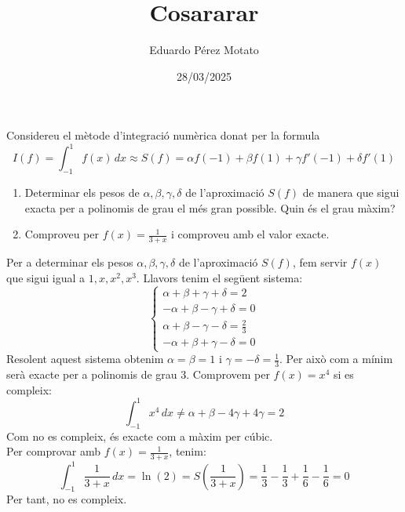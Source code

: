 \documentclass[a4paper, 12pt]{article}
\title{Cosararar}
\author{Eduardo Pérez Motato}
\date{28/03/2025}
\begin{document}
    \makeheader

    \begin{exercici}
    	Considereu el mètode d'integració numèrica donat per la formula
        \begin{displaymath}
        	I(f) = \int_{-1}^{1} f(x) \, dx \approx S(f) = \alpha f(-1) + \beta f(1) + \gamma f'(-1) + \delta f'(1)
        \end{displaymath}
        \begin{enumerate}
        	\item Determinar els pesos de $\alpha, \beta, \gamma, \delta$ de l'aproximació $S(f)$ de manera que sigui exacta per a polinomis de grau el més gran possible. Quin és el grau màxim?
         	\item Comproveu per $f(x) = \frac{1}{3+x}$ i comproveu amb el valor exacte.
        \end{enumerate}
    \end{exercici}
    \begin{solucio}
    	Per a determinar els pesos $\alpha, \beta, \gamma, \delta$ de l'aproximació $S(f)$, fem servir $f(x)$ que sigui igual a $1, x, x^2, x^3$.
     	Llavors tenim el següent sistema:
      	\begin{displaymath}
	      	\begin{cases}
	       	    \alpha + \beta + \gamma + \delta = 2 \\
				-\alpha + \beta - \gamma + \delta = 0 \\
				\alpha + \beta - \gamma - \delta = \frac{2}{3} \\
				-\alpha + \beta + \gamma - \delta = 0
	       	\end{cases}
	  	\end{displaymath}
        Resolent aquest sistema obtenim $\alpha = \beta = 1$ i $\gamma = -\delta = \frac{1}{3}$.
		Per això com a mínim serà exacte per a polinomis de grau 3. Comprovem per $f(x) = x^4$ si es compleix:
		\begin{displaymath}
			\int_{-1}^{1} x^4 \, dx \neq \alpha+\beta-4\gamma+4\gamma = 2
		\end{displaymath}
		Com no es compleix, és exacte com a màxim per cúbic.\\
		Per comprovar amb $f(x) = \frac{1}{3+x}$, tenim:
		\begin{displaymath}
			\int_{-1}^{1} \frac{1}{3+x} \, dx = \ln(2) = S\left(\frac{1}{3+x}\right) = \frac{1}{3} - \frac{1}{3} + \frac{1}{6} - \frac{1}{6} = 0
		\end{displaymath}
		Per tant, no es compleix.
    \end{solucio}
\end{document}
